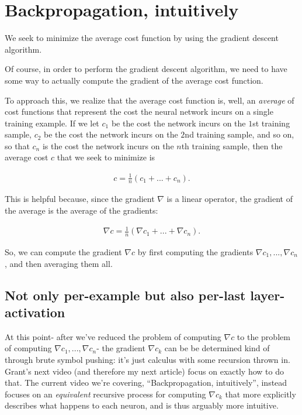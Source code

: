 \documentclass{article}
\begin{document}
	
	\section*{Backpropagation, intuitively}
	
	We seek to minimize the average cost function by using the gradient descent algorithm.
	
	Of course, in order to perform the gradient descent algorithm, we need to have some way to actually compute the gradient of the average cost function.
	
	To approach this, we realize that the average cost function is, well, an \textit{average} of cost functions that represent the cost the neural network incurs on a single training example. If we let $c_1$ be the cost the network incurs on the $1$st training sample, $c_2$ be the cost the network incurs on the $2$nd training sample, and so on, so that $c_n$ is the cost the network incurs on the $n$th training sample, then the average cost $c$ that we seek to minimize is
	
	\begin{align*}
		c = \frac{1}{n}\left(c_1 + ... + c_n\right).
	\end{align*}
	
	This is helpful because, since the gradient $\nabla$ is a linear operator, the gradient of the average is the average of the gradients:
	
	\begin{align*}
		\nabla c = \frac{1}{n}\left(\nabla c_1 + ... + \nabla c_n\right).
	\end{align*}
	
	So, we can compute the gradient $\nabla c$ by first computing the gradients $\nabla c_1, ..., \nabla c_n$, and then averaging them all.
	
	\subsection*{Not only per-example but also per-last layer-activation}
	
	At this point- after we've reduced the problem of computing $\nabla c$ to the problem of computing $\nabla c_1, ..., \nabla c_n$- the gradient $\nabla c_k$ can be be determined kind of through brute symbol pushing: it's just calculus with some recursion thrown in. Grant's next video (and therefore my next article) focus on exactly how to do that. The current video we're covering, ``Backpropagation, intuitively'', instead focuses on an \textit{equivalent} recursive process for computing $\nabla c_k$ that more explicitly describes what happens to each neuron, and is thus arguably more intuitive.
	
\end{document}
